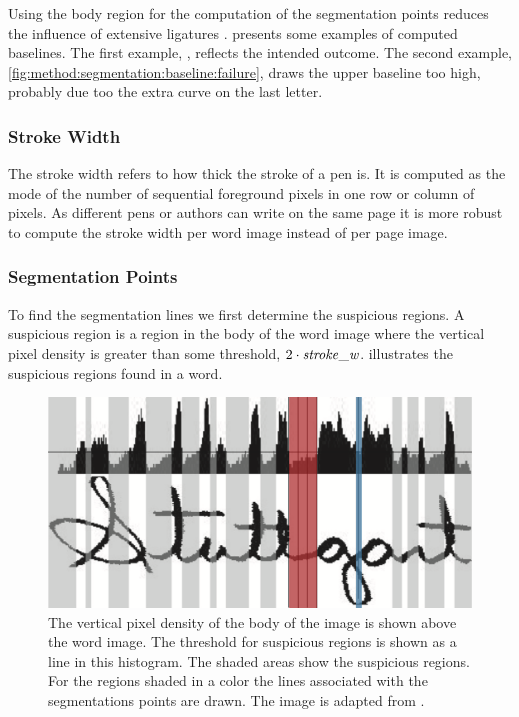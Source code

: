 	Using the body region for the computation of the segmentation points reduces the influence of extensive ligatures \cite{lee2012binary}.  presents some examples of computed baselines. The first example, , reflects the intended outcome. The second example, \cref{fig:method:segmentation:baseline:failure}, draws the upper baseline too high, probably due too the extra curve on the last letter.

\subsubsection{Stroke Width}
\label{sss:method:segmentaton:strokwidth}
	The stroke width refers to how thick the stroke of a pen is. It is computed as the mode of the number of sequential foreground pixels in one row or column of pixels. As different pens or authors can write on the same page it is more robust to compute the stroke width per word image instead of per page image.

\subsubsection{Segmentation Points}
\label{sss:method:segmentaton:segmentationpoints}
	To find the segmentation lines we first determine the suspicious regions. A suspicious region is a region in the body of the word image where the vertical pixel density is greater than some threshold, $2 \cdot \mathit{stroke\_w}$.  illustrates the suspicious regions found in a word. 

	\begin{figure}
		\centering
		\includegraphics[width=\columnwidth]{shared/img/method/suspicious_regions.png}
		\caption{The vertical pixel density of the body of the image is shown above the word image.  The threshold for suspicious regions is shown as a line in this histogram. The shaded areas show the suspicious regions. For the regions shaded in a color the lines associated with the segmentations points are drawn. The image is adapted from \cite{lee2012binary}.}
		\label{fig:method:segmentation:suspiciousRegions}
	\end{figure}

